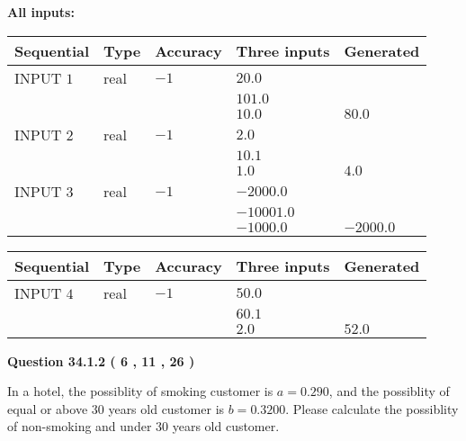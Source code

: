 \documentclass[12pt]{article}
\begin{document}
   
   
   
\noindent\vspace{0.1in}\hspace{-0.08in} {\textbf{\Large{All inputs: }}}
   
   
  
  
\noindent\begin{tabular}{|l|l|l|l|l|}
\hline
 Sequential & Type & Accuracy & Three inputs & Generated \\ 
\hline
 
 
  INPUT $            1 $ & real & $           -1  $ & $
 20.0
  $ & \\
  & & &  $
 101.0
  $ & \\
  & & &  $
 10.0
 $ & $ 80.0 $ 
 \\  \hline  
 
 
  INPUT $            2 $ & real & $           -1  $ & $
 2.0
  $ & \\
  & & &  $
 10.1
  $ & \\
  & & &  $
 1.0
 $ & $ 4.0 $ 
 \\  \hline  
 
 
  INPUT $            3 $ & real & $           -1  $ & $
 -2000.0
  $ & \\
  & & &  $
 -10001.0
  $ & \\
  & & &  $
 -1000.0
 $ & $ -2000.0 $ 
 \\  \hline  
 \end{tabular}
   
   
  
  
\noindent\begin{tabular}{|l|l|l|l|l|}
\hline
 Sequential & Type & Accuracy & Three inputs & Generated \\ 
\hline
 
 
  INPUT $            4 $ & real & $           -1  $ & $
 50.0
  $ & \\
  & & &  $
 60.1
  $ & \\
  & & &  $
 2.0
 $ & $ 52.0 $ 
 \\  \hline  
 \end{tabular}
   
   
  
\vspace{0.2in}
  
{\textbf{\Large{Question
34.1.2 
 (           6 ,          11 ,          26 )
}}}
  
  
In a hotel, the possiblity of  %
smoking customer is
$a =  %
0.290$, and the possiblity of  %
equal or above 30 years old customer is $ b =  %
0.3200$.
Please calculate the possiblity of  %
 non-smoking and  %
under 30 years old customer.
 
\end{document}
